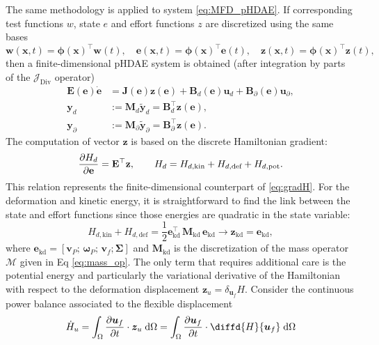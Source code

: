 \documentclass{svjour3}                     %
\DeclareMathOperator*{\Div}{Div}
\begin{document}
The same methodology is applied to system \eqref{eq:MFD_pHDAE}. If corresponding test functions $w$, state $e$ and effort functions $z$ are discretized using the same bases
\[ \bm{w}(\bm{x}, t) = \bm{\phi}(\bm{x})^\top \mathbf{w}(t), \quad \bm{e}(\bm{x}, t) = \bm{\phi}(\bm{x})^\top \mathbf{e}(t), \quad \bm{z}(\bm{x}, t) = \bm{\phi}(\bm{x})^\top \mathbf{z}(t),
\]
then a finite-dimensional pHDAE system is obtained (after integration by parts of the $\mathcal{J}_{\Div}$ operator)
\begin{equation}
\begin{aligned}
\mathbf{E}(\mathbf{e}) \dot{\mathbf{e}} &= \mathbf{J}(\mathbf{e}) \mathbf{z}(\mathbf{e}) + \mathbf{B}_d(\mathbf{e}) \mathbf{u}_d + \mathbf{B}_\partial(\mathbf{e}) \mathbf{u}_\partial, \\
\mathbf{y}_d &:= \mathbf{M}_d \widetilde{\mathbf{y}}_d = \mathbf{B}_d^\top \mathbf{z}(\mathbf{e}),  \\
\mathbf{y}_\partial &:= \mathbf{M}_\partial \widetilde{\mathbf{y}}_\partial = \mathbf{B}_\partial^\top \mathbf{z}(\mathbf{e}).
\end{aligned}
\end{equation}
The computation of vector $\mathbf{z}$ is based on the discrete Hamiltonian  gradient:
\[
\diffp{H_d}{\mathbf{e}} = \mathbf{E}^\top \mathbf{z}, \qquad H_d = H_{d, \text{kin}}+H_{d, \text{def}}+H_{d, \text{pot}}.
\]
This relation represents the finite-dimensional counterpart of \eqref{eq:gradH}. For the deformation and kinetic energy, it is straightforward to find the link between the state and effort functions since those energies are quadratic in the state variable:
\begin{equation}
H_{d, \text{kin}} + H_{d, \text{def}} = \frac{1}{2} \mathbf{e}_{\text{kd}}^\top \, \mathbf{M}_{\text{kd}} \, \mathbf{e}_{\text{kd}} \longrightarrow \mathbf{z}_{\text{kd}} = \mathbf{e}_{\text{kd}},
\end{equation}
where $\mathbf{e}_{\text{kd}} = [\mathbf{v}_P; \, \bm{\omega}_P; \, \mathbf{v}_f; \bm{\Sigma}]$ and $\mathbf{M}_{\text{kd}}$ is the discretization of the mass operator $\bm{\mathcal{M}}$ given in Eq \eqref{eq:mass_op}.
The only term that requires additional care is the potential energy and particularly the variational derivative of the Hamiltonian with respect to the deformation displacement $\bm{z}_{u}=\delta_{\bm{u}_f} H$.  Consider the continuous power balance associated to the flexible displacement
\[
\dot{H}_u = \int_{\Omega} \diffp{\bm{u}_f}{t} \cdot \bm{z}_{u} \d{\Omega} = \int_{\Omega} \diffp{\bm{u}_f}{t} \cdot \diffd{H}{\bm{u}_f} \d{\Omega}
\]
\end{document}
